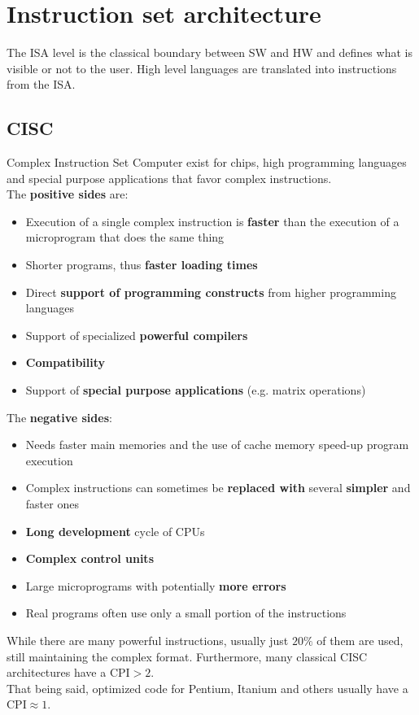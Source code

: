 \newpage
\section{Instruction set architecture}
The ISA level is the classical boundary between SW and HW and defines what is visible or not to the user. High level languages are translated into instructions from the ISA.

\subsection{CISC}
Complex Instruction Set Computer exist for chips, high programming languages and special purpose applications that favor complex instructions.\\
The \textbf{positive sides} are:
\begin{itemize}
	\item Execution of a single complex instruction is \textbf{faster} than the execution of a microprogram that does the same thing
	\item Shorter programs, thus \textbf{faster loading times}
	\item Direct \textbf{support of programming constructs} from higher programming languages
	\item Support of specialized \textbf{powerful compilers}
	\item \textbf{Compatibility}
	\item Support of \textbf{special purpose applications} (e.g. matrix operations)
\end{itemize}
The \textbf{negative sides}:
\begin{itemize}
	\item Needs faster main memories and the use of cache memory speed-up program execution
	\item Complex instructions can sometimes be \textbf{replaced with} several \textbf{simpler} and faster ones
	\item \textbf{Long development} cycle of CPUs
	\item \textbf{Complex control units}
	\item Large microprograms with potentially \textbf{more errors}
	\item Real programs often use only a small portion of the instructions
\end{itemize}

While there are many powerful instructions, usually just $20\%$ of them are used, still maintaining the complex format. Furthermore, many classical CISC architectures have a $\text{CPI}>2$.\\
That being said, optimized code for Pentium, Itanium and others usually have a $\text{CPI} \approx1$.

